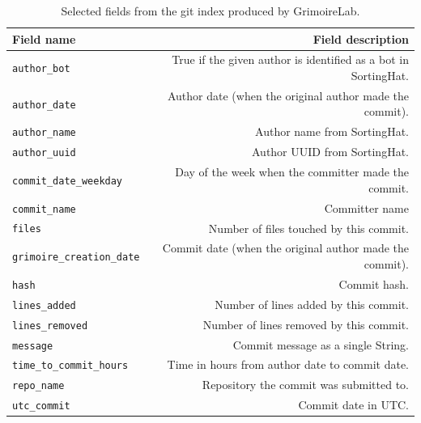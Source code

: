 \documentclass[a4paper, 12pt]{book}
\begin{document}
\begin{table}[b]  %
 \renewcommand{\arraystretch}{1.2}  %
 \begin{center}
  \begin{tabular}{ l  r }
    \toprule    %
      \textbf{Field name} & \textbf{Field description} \\ 
      \midrule %
      \texttt{author\_bot} & True if the given author is identified as a bot in SortingHat. \\
      \texttt{author\_date} & Author date (when the original author made the commit). \\
      \texttt{author\_name} & Author name from SortingHat. \\
      \texttt{author\_uuid} & Author UUID from SortingHat. \\
      \texttt{commit\_date\_weekday} & Day of the week when the committer made the commit. \\
      \texttt{commit\_name} & Committer name \\
      \texttt{files} & Number of files touched by this commit. \\
      \texttt{grimoire\_creation\_date} & Commit date (when the original author made the commit). \\
      \texttt{hash} & Commit hash. \\
      \texttt{lines\_added} & Number of lines added by this commit. \\
      \texttt{lines\_removed} & Number of lines removed by this commit. \\
      \texttt{message} & Commit message as a single String. \\
      \texttt{time\_to\_commit\_hours} & Time in hours from author date to commit date. \\
      \texttt{repo\_name} & Repository the commit was submitted to. \\
      \texttt{utc\_commit} & Commit date in UTC. \\
    \bottomrule     %
  \end{tabular}
  \caption{Selected fields from the git index produced by GrimoireLab.}
  \label{table:es-git-selected-fields}
 \end{center}
\end{table}
\end{document}
